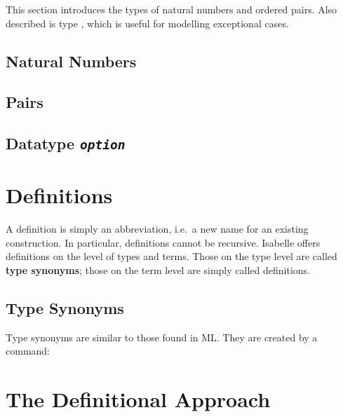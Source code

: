 This section introduces the types of natural numbers and ordered pairs.  Also
described is type , which is useful for modelling exceptional
cases. 

\subsection{Natural Numbers}
\label{sec:nat}%

\medskip




\subsection{Pairs}


\subsection{Datatype {\tt\slshape option}}
\label{sec:option}


\section{Definitions}
\label{sec:Definitions}

A definition is simply an abbreviation, i.e.\ a new name for an existing
construction. In particular, definitions cannot be recursive. Isabelle offers
definitions on the level of types and terms. Those on the type level are
called \textbf{type synonyms}; those on the term level are simply called 
definitions.


\subsection{Type Synonyms}

%
Type synonyms are similar to those found in ML\@. They are created by a 
 command:

\medskip





\section{The Definitional Approach}
\label{sec:definitional}


